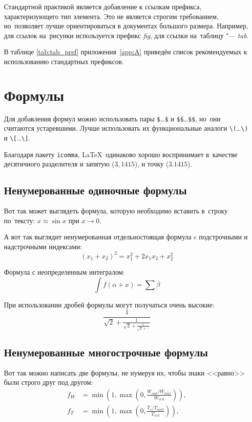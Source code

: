 Стандартной практикой является добавление к ссылкам префикса, характеризующего тип элемента.
Это не является строгим требованием, но~позволяет лучше ориентироваться в документах большого размера.
Например, для ссылок на~рисунки используется префикс \textit{fig}, для ссылки на~таблицу "--- \textit{tab}.

В таблице \cref{tab:tab_pref} приложения~\cref{app:A} приведён список рекомендуемых к использованию стандартных префиксов.

\section{Формулы}\label{sec:ch1/sec3}

Для добавления формул можно использовать пары
\verb+$+\dots\verb+$+ и \verb+$$+\dots\verb+$$+,
но~они считаются устаревшими.
Лучше использовать их функциональные аналоги
\verb+\(+\dots\verb+\)+ и \verb+\[+\dots\verb+\]+.

Благодаря пакету \verb|icomma|, \LaTeX~одинаково хорошо воспринимает
в~качестве десятичного разделителя и запятую (\(3,1415\)), и точку (\(3.1415\)).

\subsection{Ненумерованные одиночные формулы}\label{subsec:ch1/sec3/sub1}

Вот так может выглядеть формула, которую необходимо вставить в~строку
по~тексту: \(x \approx \sin x\) при \(x \to 0\).

А вот так выглядит ненумерованная отдельностоящая формула c подстрочными
и надстрочными индексами:
\[
    (x_1+x_2)^2 = x_1^2 + 2 x_1 x_2 + x_2^2
\]

Формула с неопределенным интегралом:
\[
    \int f(\alpha+x)=\sum\beta
\]

При использовании дробей формулы могут получаться очень высокие:
\[
    \frac{1}{\sqrt{2}+
        \displaystyle\frac{1}{\sqrt{2}+
            \displaystyle\frac{1}{\sqrt{2}+\cdots}}}
\]

\subsection{Ненумерованные многострочные формулы}\label{subsec:ch1/sec3/sub2}

Вот так можно написать две формулы, не нумеруя их, чтобы знаки <<равно>> были
строго друг под другом:
\begin{align}
    f_W & =  \min \left( 1, \max \left( 0, \frac{W_{soil} / W_{max}}{W_{crit}} \right)  \right), \nonumber \\
    f_T & =  \min \left( 1, \max \left( 0, \frac{T_s / T_{melt}}{T_{crit}} \right)  \right), \nonumber
\end{align}

